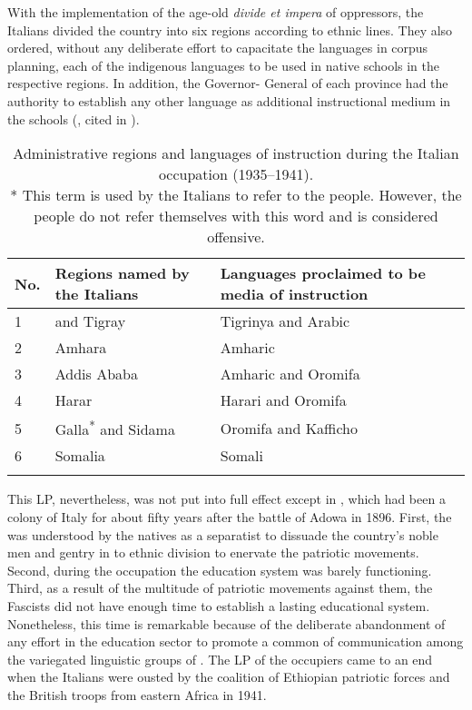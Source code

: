 \documentclass[output=paper,modfonts]{langscibook}
\begin{document}
With the implementation of the age-old \textit{divide et impera}  of oppressors, the Italians divided the country into six regions according to  ethnic lines. They also ordered, without any deliberate effort to capacitate the languages in corpus planning, each of the  indigenous languages to be used in native schools in the respective regions. In addition, the Governor- General of each province had the authority to establish any other language as additional instructional medium in the schools (\citealt[322]{Pankhurst1976}, cited in \citealt{BowenHorn1976,Bahru2002}).

\begin{table}
\begin{tabularx}{\textwidth}{llQ}
\lsptoprule
{\bfseries No.} & {\bfseries Regions named by the Italians} & {\bfseries Languages proclaimed to be media of instruction}\\
\midrule 
{1} & { and Tigray} & {Tigrinya and Arabic}\\
{2} & {Amhara} & {Amharic}\\
{3} & {Addis Ababa} & {{Amharic} and Oromifa}\\
{4} & {Harar} & {Harari and Oromifa}\\
{5} & {Galla\textsuperscript{*} and Sidama} & {Oromifa and Kafficho}\\
{6} & {Somalia} & {Somali}\\
\lspbottomrule
\end{tabularx} 
\caption{Administrative regions and languages of instruction during the Italian occupation (1935--1941).\\
* This term is used by the Italians to refer to the  people. However, the  people do not refer themselves with this word and is considered offensive.}
\label{tab:zemelak:1}
\end{table} 
 

This LP, nevertheless, was not put into full effect except in , which had been a colony of Italy for about fifty years after the battle of Adowa in 1896. First, the  was understood by the natives as a separatist  to dissuade the country’s noble men and gentry in to ethnic division to enervate the patriotic movements. Second, during the  occupation the education system was barely functioning. Third, as a result of the multitude of patriotic movements against them, the  Fascists did not have enough time to establish a lasting educational system. Nonetheless, this time is remarkable because of the deliberate abandonment of any effort in the education sector to promote a common  of communication among the variegated linguistic groups of . The LP of the occupiers came to an end when the Italians were ousted by the coalition of Ethiopian patriotic forces and the British troops from eastern Africa in 1941.
\end{document}
